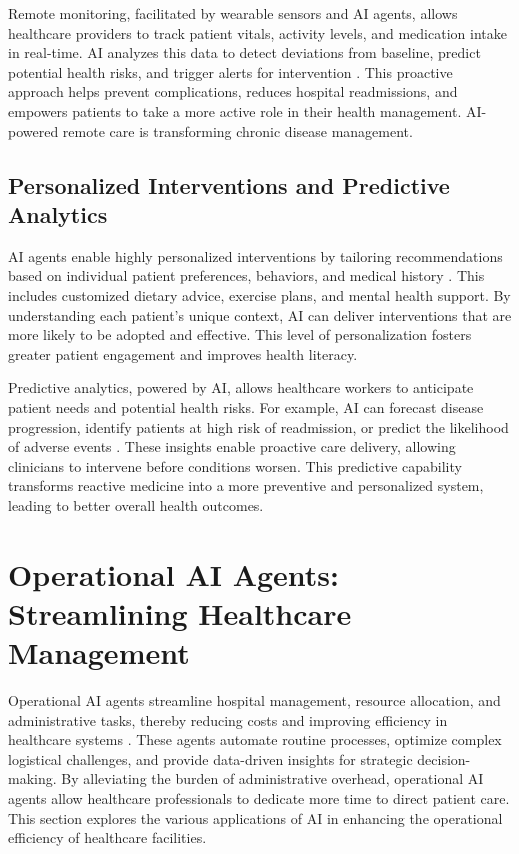 \documentclass[12pt,a4paper]{article}
\begin{document}
Remote monitoring, facilitated by wearable sensors and AI agents, allows healthcare providers to track patient vitals, activity levels, and medication intake in real-time. AI analyzes this data to detect deviations from baseline, predict potential health risks, and trigger alerts for intervention \cite{nih_patient_outcomes}. This proactive approach helps prevent complications, reduces hospital readmissions, and empowers patients to take a more active role in their health management. AI-powered remote care is transforming chronic disease management.

\subsection{Personalized Interventions and Predictive Analytics}
\label{subsec:personalized-interventions}
AI agents enable highly personalized interventions by tailoring recommendations based on individual patient preferences, behaviors, and medical history \cite{nih_patient_satisfaction}. This includes customized dietary advice, exercise plans, and mental health support. By understanding each patient's unique context, AI can deliver interventions that are more likely to be adopted and effective. This level of personalization fosters greater patient engagement and improves health literacy.

Predictive analytics, powered by AI, allows healthcare workers to anticipate patient needs and potential health risks. For example, AI can forecast disease progression, identify patients at high risk of readmission, or predict the likelihood of adverse events \cite{nih_patient_outcomes}. These insights enable proactive care delivery, allowing clinicians to intervene before conditions worsen. This predictive capability transforms reactive medicine into a more preventive and personalized system, leading to better overall health outcomes.

\section{Operational AI Agents: Streamlining Healthcare Management}
\label{sec:operational-ai}
Operational AI agents streamline hospital management, resource allocation, and administrative tasks, thereby reducing costs and improving efficiency in healthcare systems \cite{davenport2019ai}. These agents automate routine processes, optimize complex logistical challenges, and provide data-driven insights for strategic decision-making. By alleviating the burden of administrative overhead, operational AI agents allow healthcare professionals to dedicate more time to direct patient care. This section explores the various applications of AI in enhancing the operational efficiency of healthcare facilities.
\end{document}
